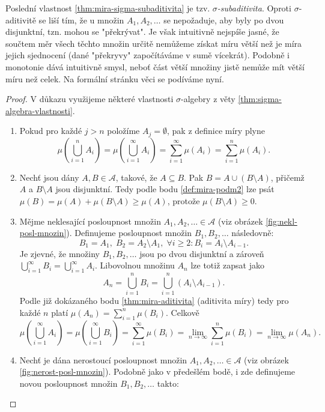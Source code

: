 Poslední vlastnost \ref{thm:mira-sigma-subaditivita} je tzv. \emph{$\sigma$-subaditivita}. Oproti $\sigma$-aditivitě se liší tím, že u množin $A_1,A_2,\dots$ se nepožaduje, aby byly po dvou disjunktní, tzn. mohou se "překrývat". Je však intuitivně nejspíše jasné, že součtem měr všech těchto množin určitě nemůžeme získat míru větší než je míra jejich sjednocení (dané "překryvy" započítáváme v sumě vícekrát). Podobně i monotonie dává intuitivně smysl, neboť část větší množiny jistě nemůže mít větší míru než celek. Na formální stránku věci se podíváme nyní.
\begin{proof}
    V důkazu využijeme některé vlastnosti $\sigma$-algebry z věty \ref{thm:sigma-algebra-vlastnosti}.
    \begin{enumerate}[label=\textit{(\roman*)}]
        \item Pokud pro každé $j>n$ položíme $A_j=\emptyset$, pak z definice míry plyne
        \[\mu\left(\bigcup_{i=1}^n A_i\right)=\mu\left(\bigcup_{i=1}^\infty A_i\right)=\sum_{i=1}^{\infty}\mu(A_i)=\sum_{i=1}^{n}\mu(A_i).\]
        \item Nechť jsou dány $A,B\in\mathcal{A}$, takové, že $A\subseteq B$. Pak $B=A\cup(B\setminus A)$, přičemž $A$ a $B\setminus A$ jsou disjunktní. Tedy podle bodu \ref{def:mira-podm2} lze psát $\mu(B)=\mu(A)+\mu(B\setminus A)\geqslant\mu(A)$, protože $\mu(B\setminus A)\geqslant 0$.
        \item Mějme neklesající posloupnost množin $A_1,A_2,\ldots\in\mathcal{A}$ (viz obrázek \ref{fig:nekl-posl-mnozin}).
        Definujeme posloupnost množin $B_1,B_2,\ldots$ následovně:
        \[B_1=A_1,\;B_2=A_2\setminus A_1,\;\forall i\geqslant 2: B_i=A_i\setminus A_{i-1}.\]
        Je zjevné, že množiny $B_1,B_2,\dots$ jsou po dvou disjunktní a zároveň\\$\bigcup_{i=1}^\infty B_i=\bigcup_{i=1}^\infty A_i$. Libovolnou množinu $A_n$ lze totiž zapsat jako
        \[A_n=\bigcup_{i=1}^n B_i=\bigcup_{i=1}^n (A_i\setminus A_{i-1}).\] 
        Podle již dokázaného bodu \ref{thm:mira-aditivita} (aditivita míry) tedy pro každé $n$ platí $\mu(A_n)=\sum_{i=1}^{n}\mu(B_i)$.
        Celkově
        \[\mu\left(\bigcup_{i=1}^\infty A_i\right)=\mu\left(\bigcup_{i=1}^\infty B_i\right)=\sum_{i=1}^{\infty}\mu(B_i)=\lim_{n\to\infty}\sum_{i=1}^{n}\mu(B_i)=\lim_{n\to\infty}\mu(A_n).\]
        \item Nechť je dána nerostoucí posloupnost množin $A_1,A_2,\ldots\in\mathcal{A}$ (viz obrázek \ref{fig:nerost-posl-mnozin}). Podobně jako v předešlém bodě, i zde definujeme novou posloupnost množin $B_1,B_2,\ldots$ takto:

\end{enumerate}
\end{proof}
